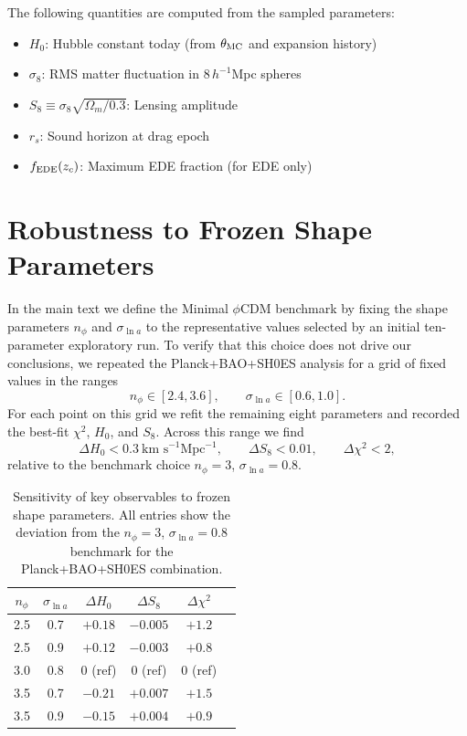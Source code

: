 \documentclass[a4paper,11pt]{article}
\begin{document}
The following quantities are computed from the sampled parameters:
\begin{itemize}
    \item $H_0$: Hubble constant today (from $\theta_{\rm MC}$ and expansion history)
    \item $\sigma_8$: RMS matter fluctuation in $8\,h^{-1}$Mpc spheres
    \item $S_8 \equiv \sigma_8\sqrt{\Omega_m/0.3}$: Lensing amplitude
    \item $r_s$: Sound horizon at drag epoch
    \item $f_{\rm EDE}(z_c)$: Maximum EDE fraction (for EDE only)
\end{itemize}


\section{Robustness to Frozen Shape Parameters}
\label{app:frozen_robustness}

In the main text we define the Minimal $\phi$CDM benchmark by fixing the shape parameters $n_\phi$ and $\sigma_{\ln a}$ to the representative values selected by an initial ten-parameter exploratory run. To verify that this choice does not drive our conclusions, we repeated the Planck+BAO+SH0ES analysis for a grid of fixed values in the ranges
\begin{equation}
n_\phi \in [2.4, 3.6], \qquad \sigma_{\ln a} \in [0.6, 1.0].
\end{equation}
For each point on this grid we refit the remaining eight parameters and recorded the best-fit $\chi^2$, $H_0$, and $S_8$. Across this range we find
\begin{equation}
\Delta H_0 < 0.3~\text{km s}^{-1}\text{Mpc}^{-1}, \qquad \Delta S_8 < 0.01, \qquad \Delta\chi^2 < 2,
\end{equation}
relative to the benchmark choice $n_\phi = 3$, $\sigma_{\ln a} = 0.8$.

\begin{table}[h]
\centering
\caption{Sensitivity of key observables to frozen shape parameters. All entries show the deviation from the $n_\phi=3$, $\sigma_{\ln a}=0.8$ benchmark for the Planck+BAO+SH0ES combination.}
\label{tab:frozen_robustness}
\begin{tabular}{cccccc}
\toprule
$n_\phi$ & $\sigma_{\ln a}$ & $\Delta H_0$ & $\Delta S_8$ & $\Delta\chi^2$ \\
\midrule
2.5 & 0.7 & $+0.18$ & $-0.005$ & $+1.2$ \\
2.5 & 0.9 & $+0.12$ & $-0.003$ & $+0.8$ \\
3.0 & 0.8 & 0 (ref) & 0 (ref) & 0 (ref) \\
3.5 & 0.7 & $-0.21$ & $+0.007$ & $+1.5$ \\
3.5 & 0.9 & $-0.15$ & $+0.004$ & $+0.9$ \\
\bottomrule
\end{tabular}
\end{table}
\end{document}
